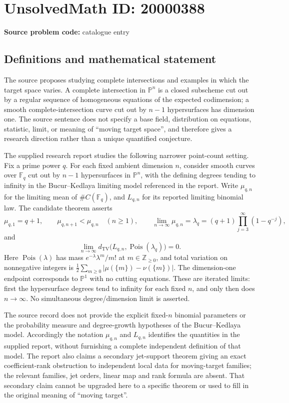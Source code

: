 \documentclass[11pt]{article}
\newcommand{\Z}{\mathbb{Z}}
\newcommand{\F}{\mathbb{F}}
\newcommand{\PP}{\mathbb{P}}
\begin{document}
\section*{UnsolvedMath ID: 20000388}
\textbf{Source problem code:} catalogue entry
\subsection{Definitions and mathematical statement}
The source proposes studying complete intersections and examples in which the target space varies. A complete intersection in \(\PP^n\) is a closed subscheme cut out by a regular sequence of homogeneous equations of the expected codimension; a smooth complete-intersection curve cut out by \(n-1\) hypersurfaces has dimension one. The source sentence does not specify a base field, distribution on equations, statistic, limit, or meaning of ``moving target space'', and therefore gives a research direction rather than a unique quantified conjecture.

The supplied research report studies the following narrower point-count setting. Fix a prime power \(q\). For each fixed ambient dimension \(n\), consider smooth curves over \(\F_q\) cut out by \(n-1\) hypersurfaces in \(\PP^n\), with the defining degrees tending to infinity in the Bucur--Kedlaya limiting model referenced in the report. Write \(\mu_{q,n}\) for the limiting mean of \(\#C(\F_q)\), and \(L_{q,n}\) for its reported limiting binomial law. The candidate theorem asserts
\[
 \mu_{q,1}=q+1,\qquad
 \mu_{q,n+1}<\mu_{q,n}\quad(n\ge1),\qquad
 \lim_{n\to\infty}\mu_{q,n}=\lambda_q
 =(q+1)\prod_{j=3}^{\infty}(1-q^{-j}),
\]
and
\[
 \lim_{n\to\infty}d_{\mathrm{TV}}
 \bigl(L_{q,n},\operatorname{Pois}(\lambda_q)\bigr)=0.
\]
Here \(\operatorname{Pois}(\lambda)\) has mass \(e^{-\lambda}\lambda^m/m!\) at \(m\in\Z_{\ge0}\), and total variation on nonnegative integers is \(\tfrac12\sum_{m\ge0}|\mu(\{m\})-\nu(\{m\})|\). The dimension-one endpoint corresponds to \(\PP^1\) with no cutting equations. These are iterated limits: first the hypersurface degrees tend to infinity for each fixed \(n\), and only then does \(n\to\infty\). No simultaneous degree/dimension limit is asserted.

The source record does not provide the explicit fixed-\(n\) binomial parameters or the probability measure and degree-growth hypotheses of the Bucur--Kedlaya model. Accordingly the notation \(\mu_{q,n}\) and \(L_{q,n}\) identifies the quantities in the supplied report, without furnishing a complete independent definition of that model. The report also claims a secondary jet-support theorem giving an exact coefficient-rank obstruction to independent local data for moving-target families; the relevant families, jet orders, linear map and rank formula are absent. That secondary claim cannot be upgraded here to a specific theorem or used to fill in the original meaning of ``moving target''.
\end{document}

